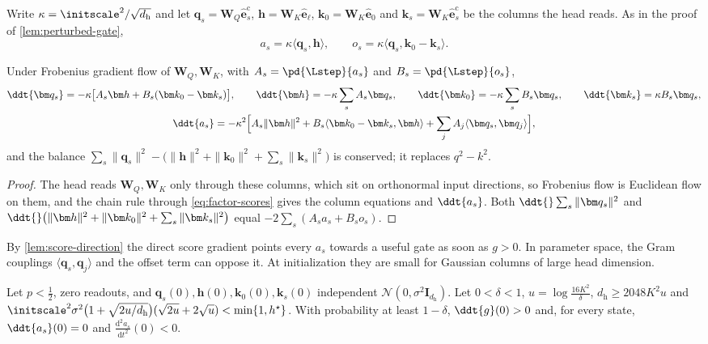 Write $\kappa=\initscale^2/\sqrt{d_{\mathrm h}}$ and let $\bm q_s=\mathbf W_Q\hat{\bm e}^{\mathrm c}_s$, $\bm h=\mathbf W_K\hat{\bm e}_\ell$, $\bm k_0=\mathbf W_K\hat{\bm e}_0$ and
$\bm k_s=\mathbf W_K\hat{\bm e}^{\mathrm c}_s$ be the columns the head reads. As in the proof of \cref{lem:perturbed-gate},
\begin{equation}
 a_s=\kappa\langle\bm q_s,\bm h\rangle,\qquad o_s=\kappa\langle\bm q_s,\bm k_0-\bm k_s\rangle .
 \label{eq:factor-scores}
\end{equation}

\begin{lemma}
\label{lem:factor-flow}
Under Frobenius gradient flow of $\mathbf W_Q,\mathbf W_K$, with $A_s=\pd{\Lstep}{a_s}$ and $B_s=\pd{\Lstep}{o_s}$,
\begin{gather*}
 \ddt{\bm q_s}=-\kappa\bigl[A_s\bm h+B_s(\bm k_0-\bm k_s)\bigr],\qquad \ddt{\bm h}=-\kappa\sum_sA_s\bm q_s,\qquad
 \ddt{\bm k_0}=-\kappa\sum_sB_s\bm q_s,\qquad \ddt{\bm k_s}=\kappa B_s\bm q_s,\\
 \ddt{a_s}=-\kappa^2\Bigl[A_s\|\bm h\|^2+B_s\langle\bm k_0-\bm k_s,\bm h\rangle+\sum_jA_j\langle\bm q_s,\bm q_j\rangle\Bigr],
\end{gather*}
and the balance $\sum_s\|\bm q_s\|^2-\bigl(\|\bm h\|^2+\|\bm k_0\|^2+\sum_s\|\bm k_s\|^2\bigr)$ is conserved; it replaces $q^2-k^2$.
\end{lemma}

\begin{proof}
The head reads $\mathbf W_Q,\mathbf W_K$ only through these columns, which sit on orthonormal input directions, so Frobenius flow is Euclidean flow on
them, and the chain rule through \cref{eq:factor-scores} gives the column equations and $\ddt{a_s}$. Both
$\ddt{}\sum_s\|\bm q_s\|^2$ and $\ddt{}\bigl(\|\bm h\|^2+\|\bm k_0\|^2+\sum_s\|\bm k_s\|^2\bigr)$ equal $-2\sum_s(A_sa_s+B_so_s)$.
\end{proof}

By \cref{lem:score-direction} the direct score gradient points every $a_s$ towards a useful gate as soon as $g>0$. In parameter space,
the Gram couplings $\langle\bm q_s,\bm q_j\rangle$ and the offset term can oppose it. At initialization they are small for Gaussian columns
of large head dimension.

\begin{proposition}
\label{prop:gaussian-acceleration}
Let $p<\frac12$, zero readouts, and $\bm q_s(0),\bm h(0),\bm k_0(0),\bm k_s(0)$ independent $\mathcal N(0,\sigma^2\mathbf I_{d_{\mathrm h}})$. Let
$0<\delta<1$, $u=\log\frac{16K^2}\delta$, $d_{\mathrm h}\ge2048K^2u$ and
$\initscale^2\sigma^2\bigl(1+\sqrt{2u/d_{\mathrm h}}\bigr)(\sqrt{2u}+2\sqrt u)<\min\{1,h^\star\}$. With probability at least $1-\delta$,
$\ddt{g}(0)>0$ and, for every state, $\ddt{a_s}(0)=0$ and $\frac{\mathrm d^2a_s}{\mathrm dt^2}(0)<0$.
\end{proposition}

